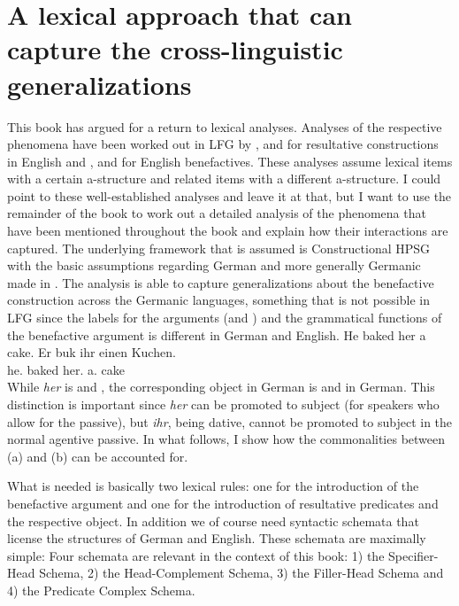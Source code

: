 \chapter{A lexical approach that can capture the cross-linguistic generalizations}
\label{sec-lexical-approach-hpsg}

This book has argued for a return to lexical analyses. Analyses of the respective phenomena have been
worked out in LFG by \citet{Simpson83a}, \citet{BZ90a} and \citet{Christie2015a-u} for resultative
constructions in English and \citet{Cook2006a-u}, \citet{Kibort2008a} and \citet{Toivonen2013a} for
English benefactives. These analyses assume lexical items with a certain a-structure and related items
with a different a-structure. I could point to these well-established analyses and leave it at that,
but I want to use the remainder of the book to work out a detailed analysis of the phenomena that
have been mentioned throughout the book and explain how their interactions are captured. The
underlying framework that is assumed is Constructional HPSG \citep{Sag97a} with the basic assumptions regarding
German and more generally Germanic made in .
The analysis is able to capture generalizations about the benefactive construction across the
Germanic languages, something that is not possible in LFG since the labels for the arguments
(\argtwo and \argthree) and the grammatical functions of the benefactive argument is different in
German and English.
\eal
\ex He baked her a cake.
\ex 
\gll Er buk ihr einen Kuchen.\\
     he.\nom{} baked her.\dat{} a.\acc{} cake\\
\zl
While \emph{her} is \argtwo and \obj, the corresponding object in German is \argthree and \objtheta
in German. This distinction is important since \emph{her} can be promoted to subject (for speakers
who allow for the passive), but \emph{ihr}, being dative, cannot be promoted to subject in the
normal agentive passive. In what follows, I show how the commonalities between (a) and
(b) can be accounted for.

What is needed is basically two lexical rules: one for the introduction of the
benefactive argument and one for the introduction of resultative predicates and the respective
object. In addition we of course need syntactic schemata that license the structures of German and
English. These schemata are maximally simple: Four schemata are relevant in the context of this
book: 1) the Specifier-Head Schema, 2) the Head-Complement Schema, 3) the Filler-Head Schema and 4)
the Predicate Complex Schema.

